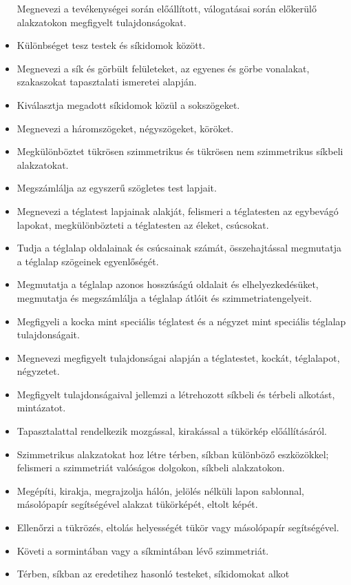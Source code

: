 \begin{itemize}
  Megnevezi a tevékenységei során előállított, válogatásai során
  előkerülő alakzatokon megfigyelt tulajdonságokat.
\item
  Különbséget tesz testek és síkidomok között.
\item
  Megnevezi a sík és görbült felületeket, az egyenes és görbe vonalakat,
  szakaszokat tapasztalati ismeretei alapján.
\item
  Kiválasztja megadott síkidomok közül a sokszögeket.
\item
  Megnevezi a háromszögeket, négyszögeket, köröket.
\item
  Megkülönböztet tükrösen szimmetrikus és tükrösen nem szimmetrikus
  síkbeli alakzatokat.
\item
  Megszámlálja az egyszerű szögletes test lapjait.
\item
  Megnevezi a téglatest lapjainak alakját, felismeri a téglatesten az
  egybevágó lapokat, megkülönbözteti a téglatesten az éleket, csúcsokat.
\item
  Tudja a téglalap oldalainak és csúcsainak számát, összehajtással
  megmutatja a téglalap szögeinek egyenlőségét.
\item
  Megmutatja a téglalap azonos hosszúságú oldalait és elhelyezkedésüket,
  megmutatja és megszámlálja a téglalap átlóit és szimmetriatengelyeit.
\item
  Megfigyeli a kocka mint speciális téglatest és a négyzet mint
  speciális téglalap tulajdonságait.
\item
  Megnevezi megfigyelt tulajdonságai alapján a téglatestet, kockát,
  téglalapot, négyzetet.
\item
  Megfigyelt tulajdonságaival jellemzi a létrehozott síkbeli és térbeli
  alkotást, mintázatot.
\item
  Tapasztalattal rendelkezik mozgással, kirakással a tükörkép
  előállításáról.
\item
  Szimmetrikus alakzatokat hoz létre térben, síkban különböző
  eszközökkel; felismeri a szimmetriát valóságos dolgokon, síkbeli
  alakzatokon.
\item
  Megépíti, kirakja, megrajzolja hálón, jelölés nélküli lapon sablonnal,
  másolópapír segítségével alakzat tükörképét, eltolt képét.
\item
  Ellenőrzi a tükrözés, eltolás helyességét tükör vagy másolópapír
  segítségével.
\item
  Követi a sormintában vagy a síkmintában lévő szimmetriát.
\item
  Térben, síkban az eredetihez hasonló testeket, síkidomokat alkot

\end{itemize}
